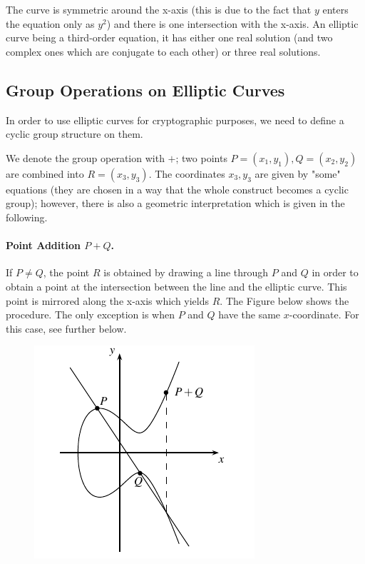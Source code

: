 The curve is symmetric around the x-axis (this is due to the fact that $y$ enters the equation only as $y^2$) and there is one intersection with the x-axis. An elliptic curve being a third-order equation, it has either one real solution (and two complex ones which are conjugate to each other) or three real solutions.

\subsection{Group Operations on Elliptic Curves}

In order to use elliptic curves for cryptographic purposes, we need to define a cyclic group structure on them. 

We denote the group operation with $+$; two points $P=(x_1, y_1), Q=(x_2, y_2)$ are combined into $R=(x_3, y_3)$. The coordinates $x_3, y_3$ are given by "some" equations (they are chosen in a way that the whole construct becomes a cyclic group); however, there is also a geometric interpretation which is given in the following.

\paragraph{Point Addition $P+Q$.} If $P\neq Q$, the point $R$ is obtained by drawing a line through $P$ and $Q$ in order to obtain a point at the intersection between the line and the elliptic curve. This point is mirrored along the x-axis which yields $R$. The Figure below shows the procedure. The only exception is when $P$ and $Q$ have the same $x$-coordinate. For this case, see further below.

\begin{figure}[H]
	\includegraphics[scale=1.0]{images/elliptic_curves_groupop_1.png}
\end{figure}

